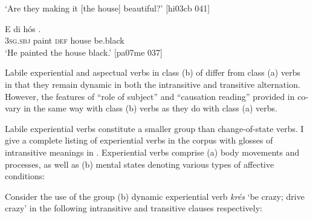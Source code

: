 \glt ‘Are they making it [the house] beautiful?’ [hi03cb 041]
\z


\ea%
    \label{ex:key:1124}
    \gll E      di  hós    .\\
\textsc{3sg.sbj}  paint  \textsc{def}  house  be.black\\

\glt ‘He painted the house black.’ [pa07me 037]
\z

Labile experiential and aspectual verbs in class (b) of  differ from class (a) verbs in that they remain dynamic in both the intransitive and transitive alternation. However, the features of “role of subject” and “causation reading” provided in  co-vary in the same way with class (b) verbs as they do with class (a) verbs.


Labile experiential verbs constitute a smaller group than change-of-state verbs. I give a complete listing of experiential verbs in the corpus with glosses of intransitive meanings in . Experiential verbs comprise (a) body movements and processes, as well as (b) mental states denoting various types of affective conditions:


Consider the use of the group (b) dynamic experiential verb \textit{krés} ‘be crazy; drive crazy’ in the following intransitive  and transitive  clauses respectively: 


